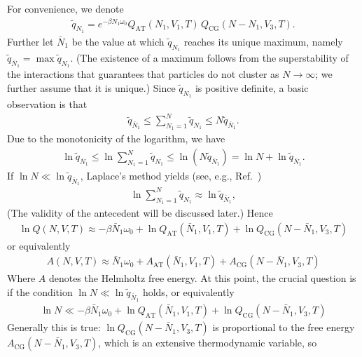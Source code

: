 \documentclass[aip,jcp,a4paper,reprint,onecolumn]{revtex4-1}
\newcommand{\AT}{{\textrm{{AT}}}}
\newcommand{\CG}{{\textrm{CG}}}
\begin{document}
For convenience, we denote
\begin{align}
  \tilde q_{N_1} = 
  e^{-\beta N_1\omega_0}
  Q_{\AT}(N_1, V_1, T)\,
  Q_{\CG}(N - N_1, V_3, T).
\end{align}
Further let $\bar N_1$ be the value at which $\tilde q_{N_1}$ reaches
its unique maximum, namely $\tilde q_{\bar N_1} = \max \tilde q_{N_1}$. (The existence of a maximum follows from the superstability of the interactions that guarantees that particles do not cluster as $N\to\infty$; we further assume that it is unique.) Since $\tilde q_{N_1}$ is positive definite, a basic
observation is that
\begin{align}
  \tilde q_{\bar N_1}
  \leq
  \sum_{N_1=1}^N \tilde q_{N_1}
  \leq
  N \tilde q_{\bar N_1}. 
\end{align}
Due to the monotonicity of the logarithm, we have
\begin{align}
  \ln\tilde q_{\bar N_1}
  \leq
  \ln\sum_{N_1=1}^N \tilde q_{N_1}
  \leq
  \ln (N \tilde q_{\bar N_1})
  =
  \ln N + \ln\tilde q_{\bar N_1}.
\end{align}
If $\ln N \ll \ln \tilde q_{\bar N_1}$, Laplace's method yields (see, e.g., Ref.~) 
\begin{align}
  \ln\sum_{N_1=1}^N \tilde q_{N_1}
  \approx
  \ln\tilde q_{\bar N_1},
\end{align}
(The validity of the antecedent will be discussed later.) Hence
\begin{align}
  \ln Q(N, V, T)
  \approx
  -\beta \bar N_1\omega_0 + 
  \ln Q_{\AT}(\bar N_1, V_1, T) + \ln Q_{\CG}(N - \bar N_1, V_3, T)
\end{align}
or equivalently
\begin{align}\label{eqn:a-energy-1}
  A(N, V, T)
  \approx
  \bar N_1\omega_0 +
  A_{\AT}(\bar N_1, V_1, T) + A_{\CG}(N - \bar N_1, V_3, T)
\end{align}
Where $A$ denotes the Helmholtz free energy. 
At this point, the crucial question is if the condition $\ln N \ll \ln \tilde q_{\bar N_1}$
holds, or equivalently
\begin{align}\label{eqn:condition}
  \ln N 
  \ll
  -\beta \bar N_1\omega_0 +
  \ln Q_{\AT}(\bar N_1, V_1, T) + \ln Q_{\CG}(N - \bar N_1, V_3, T)
\end{align}
Generally this is true: $\ln Q_{\CG}(N - \bar N_1, V_3, T)$
is proportional to the free energy $A_{\CG}(N - \bar N_1, V_3, T)$,
which is an extensive thermodynamic variable, so
\end{document}
